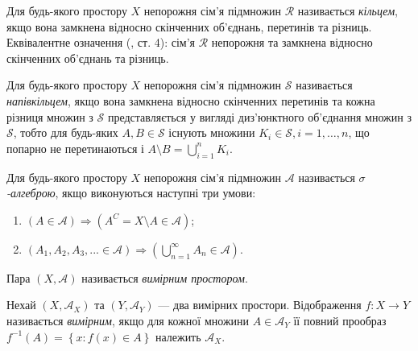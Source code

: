 \begin{definition}
    Для будь-якого простору $X$
    непорожня сім'я підмножин $\mathcal{R}$ 
    називається \emph{кільцем}, якщо
    вона замкнена відносно скінченних об'єднань, перетинів
    та різниць. Еквівалентне означення (\cite{Berezanskij}, ст. 4):
    сім'я $\mathcal{R}$ непорожня та
    замкнена відносно скінченних об'єднань та різниць.
\end{definition}
\begin{definition}
    Для будь-якого простору $X$
    непорожня сім'я підмножин $\mathcal{S}$ 
    називається \emph{напівкільцем}, якщо
    вона замкнена відносно скінченних перетинів та кожна різниця
    множин з $\mathcal{S}$ представляється
    у вигляді диз'юнктного об'єднання множин з $\mathcal{S}$, тобто
    для будь-яких $A, B \in \mathcal{S}$ існують
    множини $K_i \in \mathcal{S}, i = 1,\dots,n$,
    що попарно не перетинаються і $A \setminus B = \bigcup_{i=1}^n K_i$.
\end{definition}
\begin{definition}
    Для будь-якого простору $X$
    непорожня сім'я підмножин $\mathcal{A}$ 
    називається \emph{$\sigma$-алгеброю},
    якщо виконуються наступні три умови:
    \begin{enumerate}
        \item $\left(A \in \mathcal{A}\right) \Rightarrow \left(A^C = X \setminus A \in \mathcal{A}\right)$;
        \item $\left(A_1, A_2, A_3, ... \in \mathcal{A}\right) \Rightarrow \left(\bigcup_{n=1}^{\infty} A_n \in \mathcal{A}\right)$.
    \end{enumerate} 
    Пара $\left(X, \mathcal{A}\right)$ називається \emph{вимірним простором}.
\end{definition}
\begin{definition}
    Нехай $\left(X, \mathcal{A}_X\right)$ та $\left(Y, \mathcal{A}_Y\right)$ ---
    два вимірних простори. Відображення $f: X \to Y$ називається 
    \emph{вимірним}, якщо для кожної множини
    $A \in \mathcal{A}_Y$ її повний прообраз
    $f^{-1}(A) = \left\{x : f(x) \in A\right\}$
    належить $\mathcal{A}_X$.
\end{definition}
